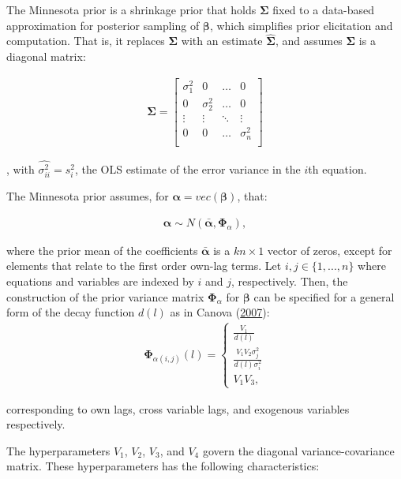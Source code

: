 \documentclass[11pt,preprint, authoryear]{elsarticle}
\numberwithin{equation}{section}
\numberwithin{figure}{section}
\numberwithin{table}{section}
\begin{document}
The Minnesota prior is a shrinkage prior that holds \(\bm{\Sigma}\)
fixed to a data-based approximation for posterior sampling of
\(\bm{\beta}\), which simplifies prior elicitation and computation. That
is, it replaces \(\bm{\Sigma}\) with an estimate \(\bm{\hat{\Sigma}}\),
and assumes \(\bm{\Sigma}\) is a diagonal matrix:

\begin{align}
\bm{\Sigma} = \begin{bmatrix} 
    \sigma^2_{1} & 0            & \dots  & 0 \\
    0            & \sigma^2_{2} & \dots  & 0 \\
    \vdots       &  \vdots            & \ddots & \vdots                 \\
    0            & 0        & \dots        & \sigma^2_{n} \\ 
    \end{bmatrix}
\end{align}

, with \(\hat{\sigma^2_{ii}} = s^2_i\), the OLS estimate of the error
variance in the \(i\)th equation.

The Minnesota prior assumes, for \(\bm{\alpha} = vec(\bm{\beta})\),
that:

\begin{align}
\bm{\alpha} \sim N(\bar{\bm{\alpha}}, \bm{\Phi}_\alpha), 
\end{align}

where the prior mean of the coefficients \(\bar{\bm{\alpha}}\) is a
\(kn \times 1\) vector of zeros, except for elements that relate to the
first order own-lag terms. Let \(i,j \in \{1,...,n\}\) where equations
and variables are indexed by \(i\) and \(j\), respectively. Then, the
construction of the prior variance matrix \(\bm{\Phi}_\alpha\) for
\(\bm{\beta}\) can be specified for a general form of the decay function
\(d(l)\) as in Canova (\protect\hyperlink{ref-canova2007}{2007}):
\begin{align}
 \bm{\Phi}_{\alpha(i,j)} (l) =
 \begin{cases} 
      \frac{V_1}{ d(l)} \\
      \frac{V_1 V_2 \sigma^2_j }{d(l) \sigma^2_i}  \label{hyper1} \\
      V_1 V_3 ,
\end{cases}
\end{align}

corresponding to own lags, cross variable lags, and exogenous variables
respectively.

The hyperparameters \(V_1\), \(V_2\), \(V_3\), and \(V_4\) govern the
diagonal variance-covariance matrix. These hyperparameters has the
following characteristics:
\end{document}
